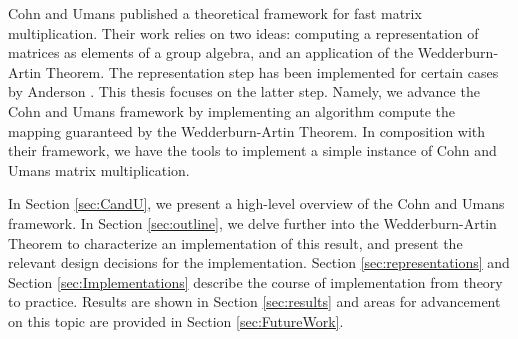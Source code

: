 \documentclass[../thesis.tex]{subfiles}
\begin{document}
Cohn and Umans \cite{CohnOld}\cite{CohnNew} published a theoretical framework for fast matrix multiplication. Their work relies on two ideas: computing a representation of matrices as elements of a group algebra, and an application of the Wedderburn-Artin Theorem. The representation step has been implemented for certain cases by Anderson \cite{anderson}. This thesis focuses on the latter step. Namely, we advance the Cohn and Umans framework by implementing an algorithm compute the mapping guaranteed by the Wedderburn-Artin Theorem. In composition with their framework, we have the tools to implement a simple instance of Cohn and Umans matrix multiplication.

In Section \ref{sec:CandU}, we present a high-level overview of the Cohn and Umans framework. In Section \ref{sec:outline}, we delve further into the Wedderburn-Artin Theorem to characterize an implementation of this result, and present the relevant design decisions for the implementation. Section \ref{sec:representations} and Section \ref{sec:Implementations} describe the course of implementation from theory to practice. Results are shown in Section \ref{sec:results} and areas for advancement on this topic are provided in Section \ref{sec:FutureWork}.
\end{document}
